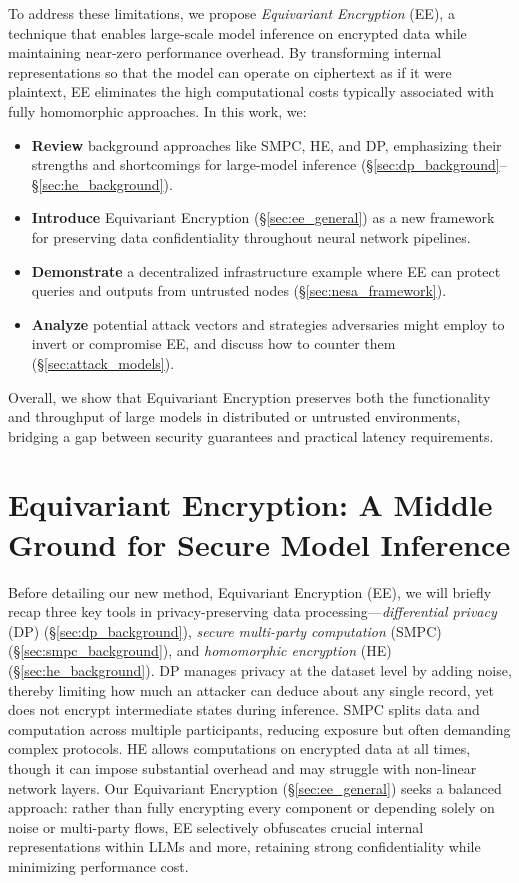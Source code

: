 \documentclass[10pt]{article}
\begin{document}
To address these limitations, we propose \textit{Equivariant Encryption} (EE), a technique that enables large-scale model inference on encrypted data while maintaining near-zero performance overhead. 
By transforming internal representations so that the model can operate on ciphertext as if it were plaintext, EE eliminates the high computational costs typically associated with fully homomorphic approaches. In this work, we:

\begin{itemize}
    \item \textbf{Review} background approaches like SMPC, HE, and DP, emphasizing their strengths and shortcomings for large-model inference (\S\ref{sec:dp_background}--\S\ref{sec:he_background}).
    \item \textbf{Introduce} Equivariant Encryption (\S\ref{sec:ee_general}) as a new framework for preserving data confidentiality throughout neural network pipelines.
    \item \textbf{Demonstrate} a decentralized infrastructure example where EE can protect queries and outputs from untrusted nodes (\S\ref{sec:nesa_framework}).
    \item \textbf{Analyze} potential attack vectors and strategies adversaries might employ to invert or compromise EE, and discuss how to counter them (\S\ref{sec:attack_models}).
\end{itemize}

Overall, we show that Equivariant Encryption preserves both the functionality and throughput of large models in distributed or untrusted environments, bridging a gap between security guarantees and practical latency requirements. 


\section{Equivariant Encryption: A Middle Ground for Secure Model Inference}

Before detailing our new method, Equivariant Encryption (EE), we will briefly recap three key tools in privacy-preserving data processing—\textit{differential privacy} (DP) (\S\ref{sec:dp_background}), \textit{secure multi-party computation} (SMPC) (\S\ref{sec:smpc_background}), and \textit{homomorphic encryption} (HE) (\S\ref{sec:he_background}). 
DP manages privacy at the dataset level by adding noise, thereby limiting how much an attacker can deduce about any single record, yet does not encrypt intermediate states during inference.
SMPC splits data and computation across multiple participants, reducing exposure but often demanding complex protocols.
HE allows computations on encrypted data at all times, though it can impose substantial overhead and may struggle with non-linear network layers. 
Our Equivariant Encryption (\S\ref{sec:ee_general}) seeks a balanced approach: rather than fully encrypting every component or depending solely on noise or multi-party flows, EE selectively obfuscates crucial internal representations within LLMs and more, retaining strong confidentiality while minimizing performance cost.
\end{document}
